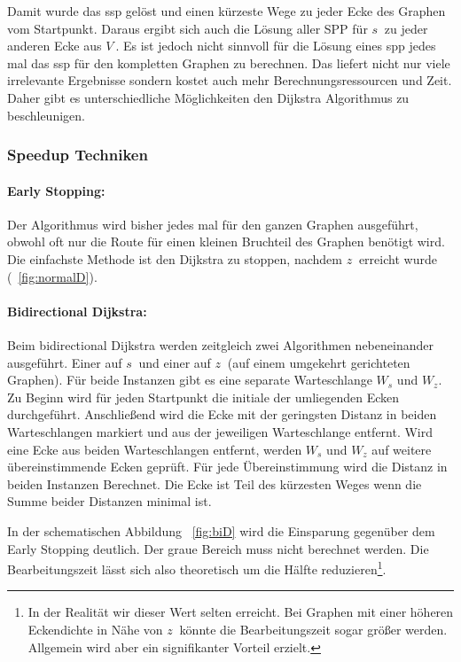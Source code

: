 \documentclass[12pt,a4paper]{article}
\begin{document}
Damit wurde das \gls{ssp} gelöst und einen kürzeste Wege zu jeder Ecke des Graphen vom Startpunkt. Daraus ergibt sich auch die Lösung aller SPP für $s~$ zu jeder anderen Ecke aus $V~$. Es ist jedoch nicht sinnvoll für die Lösung eines \gls{spp} jedes mal das \gls{ssp} für den kompletten Graphen zu berechnen. Das liefert nicht nur viele irrelevante Ergebnisse sondern kostet auch mehr Berechnungsressourcen und Zeit. Daher gibt es unterschiedliche Möglichkeiten den Dijkstra Algorithmus zu beschleunigen.

\subsubsection{Speedup Techniken}

\paragraph*{Early Stopping:}
Der Algorithmus wird bisher jedes mal für den ganzen Graphen ausgeführt, obwohl oft nur die Route für einen kleinen Bruchteil des Graphen benötigt wird. Die einfachste Methode ist den Dijkstra zu stoppen, nachdem $z~$ erreicht wurde (~\ref{fig:normalD}). 


\paragraph*{Bidirectional Dijkstra:}
Beim bidirectional Dijkstra werden zeitgleich zwei Algorithmen nebeneinander ausgeführt. Einer auf $s~$ und einer auf $z~$ (auf einem umgekehrt gerichteten Graphen). Für beide Instanzen gibt es eine separate Warteschlange $W_{s}$ und $W_{z}$. Zu Beginn wird für jeden Startpunkt die initiale der umliegenden Ecken durchgeführt. Anschließend wird die Ecke mit der geringsten Distanz in beiden Warteschlangen markiert und aus der jeweiligen Warteschlange entfernt. Wird eine Ecke aus beiden Warteschlangen entfernt, werden $W_{s}$ und $W_{z}$ auf weitere übereinstimmende Ecken geprüft. Für jede Übereinstimmung wird die Distanz in beiden Instanzen Berechnet. Die Ecke ist Teil des kürzesten Weges wenn die Summe beider Distanzen minimal ist.\par
In der schematischen Abbildung ~\ref{fig:biD} wird die Einsparung gegenüber dem Early Stopping deutlich. Der graue Bereich muss nicht berechnet werden. Die Bearbeitungszeit lässt sich also theoretisch um die Hälfte reduzieren\footnote{In der Realität wir dieser Wert selten erreicht. Bei Graphen mit einer höheren Eckendichte in Nähe von $z~$ könnte die Bearbeitungszeit sogar größer werden. Allgemein wird aber ein signifikanter Vorteil erzielt.}.
\end{document}

